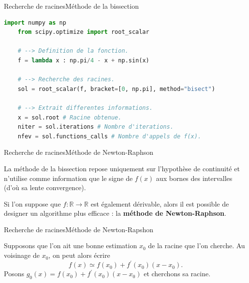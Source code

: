 \documentclass[usenames,dvipsnames,svgnames,10pt,aspectratio=169]{beamer}
\begin{document}
\begin{frame}[t, c, fragile]{Recherche de racines}{Méthode de la bissection}
  \begin{lstlisting}[language=Python]
    import numpy as np
    from scipy.optimize import root_scalar

    # --> Definition de la fonction.
    f = lambda x : np.pi/4 - x + np.sin(x)

    # --> Recherche des racines.
    sol = root_scalar(f, bracket=[0, np.pi], method="bisect")

    # --> Extrait differentes informations.
    x = sol.root # Racine obtenue.
    niter = sol.iterations # Nombre d'iterations.
    nfev = sol.functions_calls # Nombre d'appels de f(x).
  \end{lstlisting}
\end{frame}

\begin{frame}[t, c]{Recherche de racines}{Méthode de Newton-Raphson}
  \begin{minipage}{.68\textwidth}
    La méthode de la bissection repose uniquement sur l'hypothèse de continuité et n'utilise comme information que le signe de $f(x)$ aux bornes des intervalles (d'où sa lente convergence).

    \bigskip

    Si l'on suppose que $f : \mathbb{R} \to \mathbb{R}$ est également dérivable, alors il est possible de designer un algorithme plus efficace : la \alert{\textbf{méthode de Newton-Raphson}}.
  \end{minipage}%
  \hfill
  \begin{minipage}{.28\textwidth}
  \end{minipage}

  \vspace{1cm}
\end{frame}

\begin{frame}[t, c]{Recherche de racines}{Méthode de Newton-Rapshon}
  \begin{minipage}{.68\textwidth}
    Supposons que l'on ait une bonne estimation $x_0$ de la racine que l'on cherche.
    Au voisinage de $x_0$, on peut alors écrire
    \[
    f(x) \simeq f(x_0) + f^{\prime}(x_0) \left(x - x_0 \right).
    \]
    Posons $g_0(x) = f(x_0) + f^{\prime}(x_0) \left( x - x_0 \right)$ et cherchons sa racine.
  \end{minipage}%
  \hfill
  \begin{minipage}{.28\textwidth}
  \end{minipage}

  \vspace{1cm}
\end{frame}
\end{document}
